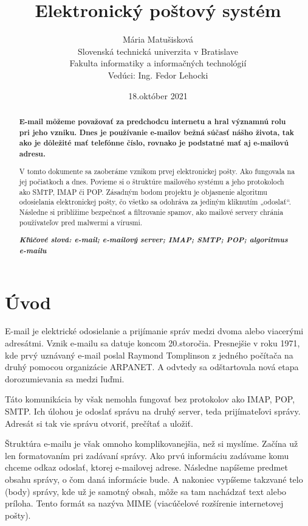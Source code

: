 \documentclass[10pt,slovak,twoside,a4paper]{article}
\title{\bf Elektronický poštový systém}
\author{Mária Matušisková\\[2pt]
	{\small Slovenská technická univerzita v Bratislave}\\
	{\small Fakulta informatiky a informačných technológií}\\
	{\small Vedúci: Ing. Fedor Lehocki}
	}
\date{\small 18.október 2021}
\begin{document}
\maketitle


\begin{abstract}

{\bf E-mail môžeme považovať za predchodcu internetu a hral významnú rolu pri jeho vzniku. Dnes je používanie e-mailov bežná súčasť nášho života, tak ako je dôležité mať telefónne číslo, rovnako je podstatné mať aj e-mailovú adresu.

V tomto dokumente sa zaoberáme vznikom prvej elektronickej pošty. Ako fungovala na jej počiatkoch a dnes. Povieme si o štruktúre mailového systému a jeho protokoloch ako SMTP, IMAP či POP. Zásadným bodom projektu je objasnenie algoritmu odosielania elektronickej pošty, čo všetko sa odohráva za jediným kliknutím „odoslať“. Následne si priblížime bezpečnosť a filtrovanie spamov,  ako mailové servery chránia používateľov pred malwermi a vírusmi.}
\par
\vspace{.3cm}
\textbf{\textit{Kľúčové slová: e-mail; e-mailový server; IMAP; SMTP; POP; algoritmus e-mailu}}
\end{abstract}

\section{Úvod}
E-mail je elektrické odosielanie a prijímanie správ medzi dvoma alebo viacerými adresátmi. Vznik e-mailu sa datuje koncom 20.storočia. Presnejšie v roku 1971, kde prvý uznávaný e-mail poslal Raymond Tomplinson z jedného počítača na druhý pomocou organizácie ARPANET. A odvtedy sa odštartovala nová etapa dorozumievania sa medzi ľuďmi. 

Táto komunikácia by však nemohla fungovať bez protokolov ako IMAP, POP, SMTP. Ich úlohou je odoslať správu na druhý server, teda prijímateľovi správy. Adresát si tak vie správu otvoriť, prečítať a uložiť. 

Štruktúra e-mailu je však omnoho komplikovanejšia, než si myslíme. Začína už len formatovaním pri zadávaní správy. Ako prvú informáciu zadávame komu chceme odkaz odoslať, ktorej e-mailovej adrese. Následne napíšeme predmet obsahu správy, o čom daná informácie bude. A nakoniec vypíšeme takzvané telo (body) správy, kde už je samotný obsah, môže sa tam nachádzať text alebo príloha. Tento formát sa nazýva MIME (viacúčelové rozšírenie internetovej pošty).
\end{document}
